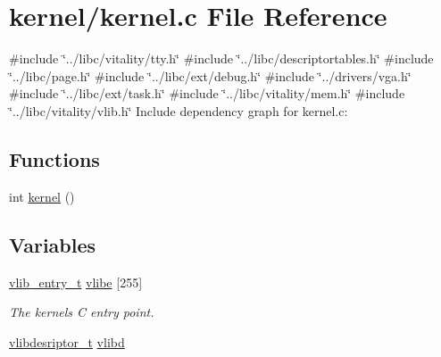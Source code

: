 \hypertarget{a00041}{}\section{kernel/kernel.c File Reference}
\label{a00041}
{\ttfamily \#include \char`\"{}../libc/vitality/tty.\+h\char`\"{}}\newline
{\ttfamily \#include \char`\"{}../libc/descriptortables.\+h\char`\"{}}\newline
{\ttfamily \#include \char`\"{}../libc/page.\+h\char`\"{}}\newline
{\ttfamily \#include \char`\"{}../libc/ext/debug.\+h\char`\"{}}\newline
{\ttfamily \#include \char`\"{}../drivers/vga.\+h\char`\"{}}\newline
{\ttfamily \#include \char`\"{}../libc/ext/task.\+h\char`\"{}}\newline
{\ttfamily \#include \char`\"{}../libc/vitality/mem.\+h\char`\"{}}\newline
{\ttfamily \#include \char`\"{}../libc/vitality/vlib.\+h\char`\"{}}\newline
Include dependency graph for kernel.\+c\+:
\subsection*{Functions}
\begin{DoxyCompactItemize}
\item 
int \hyperlink{a00041_a4ee3d1f05046b7afc6b4d516bf10667a_a4ee3d1f05046b7afc6b4d516bf10667a}{kernel} ()
\end{DoxyCompactItemize}
\subsection*{Variables}
\begin{DoxyCompactItemize}
\item 
\hyperlink{a00137_a97c1a7136f2ab06368e93c2d7533d619_a97c1a7136f2ab06368e93c2d7533d619}{vlib\+\_\+entry\+\_\+t} \hyperlink{a00041_af69f4f709fdab28dec6b8fb75fb4d526_af69f4f709fdab28dec6b8fb75fb4d526}{vlibe} \mbox{[}255\mbox{]}
\begin{DoxyCompactList}\small\item\em The kernels C entry point. \end{DoxyCompactList}\item 
\hyperlink{a00137_a2d9000b4fbb25c5ed2950a2d8f4921d5_a2d9000b4fbb25c5ed2950a2d8f4921d5}{vlibdesriptor\+\_\+t} \hyperlink{a00041_a2125beec541d04796805161dbec05fcf_a2125beec541d04796805161dbec05fcf}{vlibd}
\end{DoxyCompactItemize}


